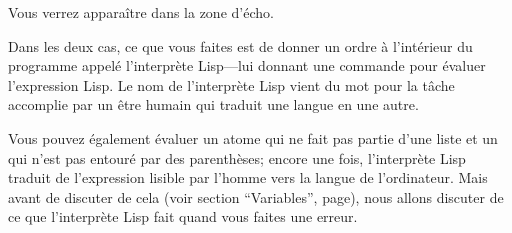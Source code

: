 Vous verrez  apparaître dans la zone
d'écho.

Dans les deux cas, ce que vous faites est de donner un ordre à
l'intérieur du programme \gem appelé l'interprète Lisp---lui donnant
une commande pour évaluer l'expression Lisp. Le nom de l'interprète
Lisp vient du mot pour la tâche accomplie par un être humain qui
traduit une langue en une autre.

Vous pouvez également évaluer un atome qui ne fait pas partie d'une
liste et un qui n'est pas entouré par des parenthèses; encore une
fois, l'interprète Lisp traduit de l'expression lisible par l'homme vers
la langue de l'ordinateur. Mais avant de discuter de cela (voir
section ``Variables'', page), nous allons
discuter de ce que l'interprète Lisp fait quand vous faites une
erreur. 

